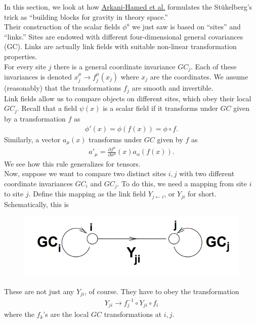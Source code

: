 \documentclass{book}
\theoremstyle{definition}
\newcommand{\p}{\partial}
\newcommand{\f}[2]{\frac{#1}{#2}}
\begin{document}
In this section, we look at how \href{https://arxiv.org/pdf/hep-th/0210184.pdf}{\underline{Arkani-Hamed et al.}} formulates the St\"{u}kelberg's trick as ``building blocks for gravity in theory space.''\\

Their construction of the scalar fields $\phi^a$ we just saw is based on ``sites'' and ``links.'' Sites are endowed with different four-dimensional general covariances (GC). Links are actually link fields with suitable non-linear transformation properties. \\

For every site $j$ there is a general coordinate invariance $GC_j$. Each of these invariances is denoted $x^\mu_j \to f^\mu_j(x_j)$ where $x_j$ are the coordinates. We assume (reasonably) that the transformations $f_j$ are smooth and invertible.\\

Link fields allow us to compare objects on different sites, which obey their local $GC_j$. Recall that a field $\psi(x)$ is a scalar field if it transforms under $GC$ given by a transformation $f$ as
\begin{align}
\phi'(x) = \phi(f(x)) = \phi \circ f.
\end{align}
Similarly, a vector $a_\mu(x)$ transforms under $GC$ given by $f$ as
\begin{align}
a'_\mu = \f{\p f^\alpha}{\p x^\mu}(x)a_\alpha(f(x)).
\end{align}
We see how this rule generalizes for tensors. \\

Now, suppose we want to compare two distinct sites $i,j$ with two different coordinate invariances $GC_i$ and $GC_j$. To do this, we need a mapping from site $i$ to site $j$. Define this mapping as the link field $Y_{j\leftarrow i}$, or $Y_{ji}$ for short. Schematically, this is 
\begin{figure}[!htb]
	\centering
	\includegraphics[scale=0.3]{link}
\end{figure}



These are not just any $Y_{ji}$, of course. They have to obey the transformation
\begin{align}
Y_{ji} \to f_j^{-1} \circ Y_{ji} \circ f_i
\end{align}
where the $f_k$'s are the local $GC$ transformations at $i,j$.\\
\end{document}
